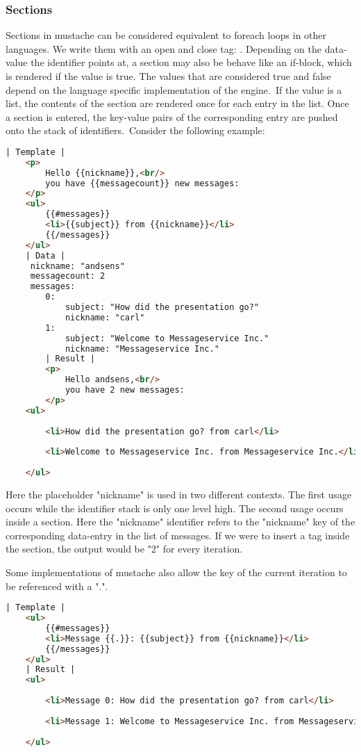 \subsubsection{Sections}
Sections in mustache can be considered equivalent to foreach loops in other
languages. We write them with an open and close tag:
.
Depending on the data-value the identifier points at, a section may also be
behave like an if-block, which is rendered if the value is true. The values that
are considered true and false depend on the language specific implementation
of the engine.\
If the value is a list, the contents of the section are rendered once for each
entry in the list. Once a section is entered, the key-value pairs of the
corresponding entry are pushed onto the stack of identifiers.\
Consider the following example:
\begin{lstlisting}[language=HTML]
	| Template |
	<p>
		Hello {{nickname}},<br/>
		you have {{messagecount}} new messages:
	</p>
	<ul>
		{{#messages}}
		<li>{{subject}} from {{nickname}}</li>
		{{/messages}}
	</ul>
	| Data |
	 nickname: "andsens"
	 messagecount: 2
	 messages:
	 	0:
	 		subject: "How did the presentation go?"
	 		nickname: "carl"
	 	1:
	 		subject: "Welcome to Messageservice Inc."
	 		nickname: "Messageservice Inc."
		| Result |
		<p>
			Hello andsens,<br/>
			you have 2 new messages:
		</p>
	<ul>
		
		<li>How did the presentation go? from carl</li>
		
		<li>Welcome to Messageservice Inc. from Messageservice Inc.</li>
		
	</ul>
\end{lstlisting}
Here the placeholder "nickname" is used in two different contexts.
The first usage occurs while the identifier stack is only one level high.
The second usage occurs inside a section. Here the "nickname" identifier refers
to the "nickname" key of the corresponding data-entry in the list of messages.
If we were to insert a \inline{\{\{messagecount\}\}} tag inside the section,
the output would be "2" for every iteration.

Some implementations of mustache also allow the key of the current iteration to
be referenced with a ".".
\begin{lstlisting}[language=HTML]
	| Template |
	<ul>
		{{#messages}}
		<li>Message {{.}}: {{subject}} from {{nickname}}</li>
		{{/messages}}
	</ul>
	| Result |
	<ul>
		
		<li>Message 0: How did the presentation go? from carl</li>
		
		<li>Message 1: Welcome to Messageservice Inc. from Messageservice Inc.</li>
		
	</ul>
\end{lstlisting}

